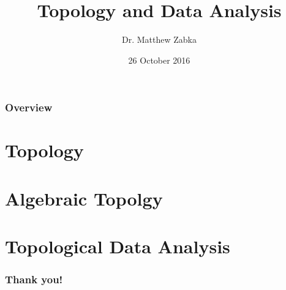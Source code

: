 \documentclass{beamer}
\title[TDA]{Topology and Data Analysis} %
\author{Dr. Matthew Zabka} %
\institute[SMSU] %
{
Southwest Minnesota State University \\ %
}
\date{26 October 2016} %
\begin{document}

\begin{frame}
\titlepage %
\end{frame}
\begin{frame}
\frametitle{Overview} %
\tableofcontents %
\end{frame}

\section{Topology} 

\section{Algebraic Topolgy}

\section{Topological Data Analysis}

\begin{frame}
\frametitle{Thank you!}
\end{frame}
\begin{frame}

\end{frame}
\end{document}

